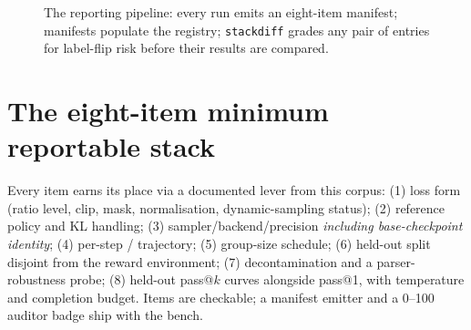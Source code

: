 \begin{figure}[t]
\centering
{}
\caption{The reporting pipeline: every run emits an eight-item manifest;
manifests populate the registry; \texttt{stackdiff} grades any pair of
entries for label-flip risk before their results are compared.}
\label{fig:pipeline}
\end{figure}

\section{The eight-item minimum reportable stack}
Every item earns its place via a documented lever from this corpus:
(1) loss form (ratio level, clip, mask, normalisation, dynamic-sampling
status); (2) reference policy and KL handling; (3) sampler/backend/precision
\emph{including base-checkpoint identity}; (4) per-step \ZVF{}/\GU{}
trajectory; (5) group-size schedule; (6) held-out split disjoint from the
reward environment; (7) decontamination and a parser-robustness probe;
(8) held-out pass@$k$ curves alongside pass@1, with temperature and completion
budget. Items are checkable; a manifest emitter and a 0--100 auditor badge
ship with the bench.

